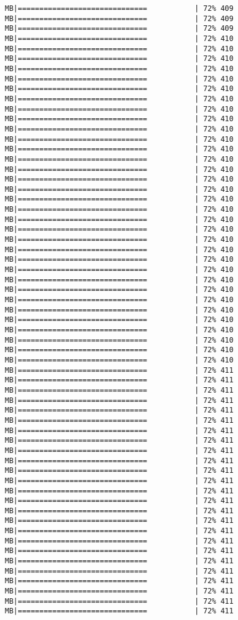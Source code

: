 \documentclass[
]{article}
\begin{document}
\begin{verbatim}
MB|==============================           | 72% 409 MB|==============================           | 72% 409 MB|==============================           | 72% 409 MB|==============================           | 72% 410 MB|==============================           | 72% 410 MB|==============================           | 72% 410 MB|==============================           | 72% 410 MB|==============================           | 72% 410 MB|==============================           | 72% 410 MB|==============================           | 72% 410 MB|==============================           | 72% 410 MB|==============================           | 72% 410 MB|==============================           | 72% 410 MB|==============================           | 72% 410 MB|==============================           | 72% 410 MB|==============================           | 72% 410 MB|==============================           | 72% 410 MB|==============================           | 72% 410 MB|==============================           | 72% 410 MB|==============================           | 72% 410 MB|==============================           | 72% 410 MB|==============================           | 72% 410 MB|==============================           | 72% 410 MB|==============================           | 72% 410 MB|==============================           | 72% 410 MB|==============================           | 72% 410 MB|==============================           | 72% 410 MB|==============================           | 72% 410 MB|==============================           | 72% 410 MB|==============================           | 72% 410 MB|==============================           | 72% 410 MB|==============================           | 72% 410 MB|==============================           | 72% 410 MB|==============================           | 72% 410 MB|==============================           | 72% 410 MB|==============================           | 72% 410 MB|==============================           | 72% 411 MB|==============================           | 72% 411 MB|==============================           | 72% 411 MB|==============================           | 72% 411 MB|==============================           | 72% 411 MB|==============================           | 72% 411 MB|==============================           | 72% 411 MB|==============================           | 72% 411 MB|==============================           | 72% 411 MB|==============================           | 72% 411 MB|==============================           | 72% 411 MB|==============================           | 72% 411 MB|==============================           | 72% 411 MB|==============================           | 72% 411 MB|==============================           | 72% 411 MB|==============================           | 72% 411 MB|==============================           | 72% 411 MB|==============================           | 72% 411 MB|==============================           | 72% 411 MB|==============================           | 72% 411 MB|==============================           | 72% 411 MB|==============================           | 72% 411 MB|==============================           | 72% 411 MB|==============================           | 72% 411 MB|==============================           | 72% 411 
\end{verbatim}
\end{document}

